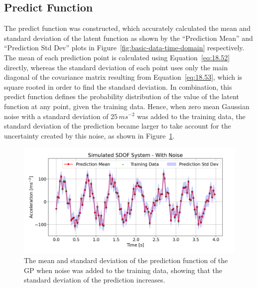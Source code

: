 \documentclass[12pt]{article}
\begin{document}
    \subsection{Predict Function}
    The predict function was constructed, which accurately calculated the mean and standard deviation of the latent function as shown by the ``Prediction Mean'' and ``Prediction Std Dev'' plots in Figure~\ref{fig:basic-data-time-domain} respectively.
    The mean of each prediction point is calculated using Equation~\ref{eq:18.52} directly, whereas the standard deviation of each point uses only the main diagonal of the covariance matrix resulting from Equation~\ref{eq:18.53}, which is square rooted in order to find the standard deviation.
    In combination, this predict function defines the probability distribution of the value of the latent function at any point, given the training data.
    Hence, when zero mean Gaussian noise with a standard deviation of $25 \, ms^{-2}$ was added to the training data, the standard deviation of the prediction became larger to take account for the uncertainty created by this noise, as shown in Figure~\ref{fig:noisy-data-time-domain}.



    \begin{figure}[h]
        \centering
        \includegraphics[width=1.0\linewidth]{figures/noisy-data-time-domain/noisy-data-time-domain.png}
        \caption{The mean and standard deviation of the prediction function of the GP when noise was added to the training data, showing that the standard deviation of the prediction increases.}
        \label{fig:noisy-data-time-domain}
    \end{figure}
\end{document}
